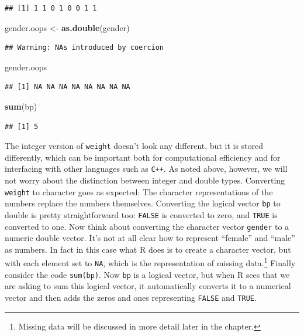\documentclass[
]{krantz}
\newenvironment{Shaded}{\begin{snugshade}}{\end{snugshade}}
\newcommand{\KeywordTok}[1]{\textcolor[rgb]{0.13,0.29,0.53}{\textbf{#1}}}
\newcommand{\NormalTok}[1]{#1}
\newcommand{\StringTok}[1]{\textcolor[rgb]{0.31,0.60,0.02}{#1}}
\begin{document}
\begin{verbatim}
## [1] 1 1 0 1 0 0 1 1
\end{verbatim}

\begin{Shaded}
\begin{Highlighting}[]
\NormalTok{gender.oops \textless{}{-}}\StringTok{ }\KeywordTok{as.double}\NormalTok{(gender)}
\end{Highlighting}
\end{Shaded}

\begin{verbatim}
## Warning: NAs introduced by coercion
\end{verbatim}

\begin{Shaded}
\begin{Highlighting}[]
\NormalTok{gender.oops}
\end{Highlighting}
\end{Shaded}

\begin{verbatim}
## [1] NA NA NA NA NA NA NA NA
\end{verbatim}

\begin{Shaded}
\begin{Highlighting}[]
\KeywordTok{sum}\NormalTok{(bp)}
\end{Highlighting}
\end{Shaded}

\begin{verbatim}
## [1] 5
\end{verbatim}

The integer version of \texttt{weight} doesn't look any different, but it is stored differently, which can be important both for computational efficiency and for interfacing with other languages such as \texttt{C++}. As noted above, however, we will not worry about the distinction between integer and double types. Converting \texttt{weight} to character goes as expected: The character representations of the numbers replace the numbers themselves. Converting the logical vector \texttt{bp} to double is pretty straightforward too: \texttt{FALSE} is converted to zero, and \texttt{TRUE} is converted to one. Now think about converting the character vector \texttt{gender} to a numeric double vector. It's not at all clear how to represent ``female'' and ``male'' as numbers. In fact in this case what R does is to create a character vector, but with each element set to \texttt{NA}, which is the representation of missing data.\footnote{Missing data will be discussed in more detail later in the chapter.} Finally consider the code \texttt{sum(bp)}. Now \texttt{bp} is a logical vector, but when R sees that we are asking to sum this logical vector, it automatically converts it to a numerical vector and then adds the zeros and ones representing \texttt{FALSE} and \texttt{TRUE}.
\end{document}
